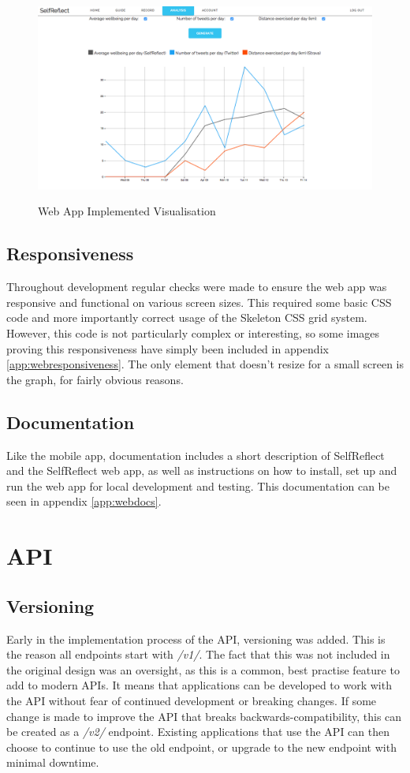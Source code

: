 \documentclass[11pt,openright,a4paper]{report}
\begin{document}
\begin{figure}[ht]
\centering
\caption{Web App Implemented Visualisation}
\includegraphics[width=\textwidth]{i/webanalysisgraph.png}
\label{fig:webanalysisgraph}
\end{figure}

\newpage
\subsection{Responsiveness}
Throughout development regular checks were made to ensure the web app was responsive and functional on various screen sizes. This required some basic CSS code and more importantly correct usage of the Skeleton CSS grid system. However, this code is not particularly complex or interesting, so some images proving this responsiveness have simply been included in appendix \ref{app:webresponsiveness}. The only element that doesn't resize for a small screen is the graph, for fairly obvious reasons.

\subsection{Documentation}
Like the mobile app, documentation includes a short description of SelfReflect and the SelfReflect web app, as well as instructions on how to install, set up and run the web app for local development and testing. This documentation can be seen in appendix \ref{app:webdocs}.

\section{API} \label{sec:apiimpl}
\subsection{Versioning}
Early in the implementation process of the API, versioning was added. This is the reason all endpoints start with \emph{/v1/}. The fact that this was not included in the original design was an oversight, as this is a common, best practise feature to add to modern APIs. It means that applications can be developed to work with the API without fear of continued development or breaking changes. If some change is made to improve the API that breaks backwards-compatibility, this can be created as a \emph{/v2/} endpoint. Existing applications that use the API can then choose to continue to use the old endpoint, or upgrade to the new endpoint with minimal downtime.
\end{document}
